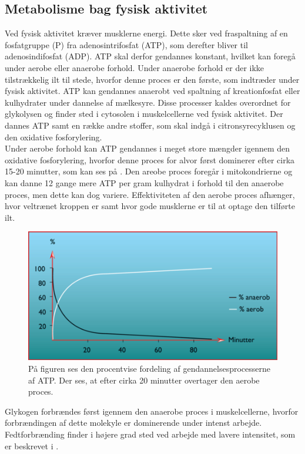 \subsection{Metabolisme bag fysisk aktivitet}
Ved fysisk aktivitet kræver musklerne energi. Dette sker ved fraspaltning af en fosfatgruppe (P) fra adenosintrifosfat (ATP), som derefter bliver til adenosindifosfat (ADP). ATP skal derfor gendannes konstant, hvilket kan foregå under aerobe eller anaerobe forhold. Under anaerobe forhold er der ikke tilstrækkelig ilt til stede, hvorfor denne proces er den første, som indtræder under fysisk aktivitet. ATP kan gendannes anaerobt ved spaltning af kreationfosfat eller kulhydrater under dannelse af mælkesyre. Disse processer kaldes overordnet for glykolysen og finder sted i cytosolen i muskelcellerne ved fysisk aktivitet. Der dannes ATP samt en række andre stoffer, som skal indgå i citronsyrecyklusen og den oxidative fosforylering.\citep{Martini2012,Engelbreth2010} \\
Under aerobe forhold kan ATP gendannes i meget store mængder igennem den oxidative fosforylering, hvorfor denne proces for alvor først dominerer efter cirka 15-20 minutter, som kan ses på . Den areobe proces foregår i mitokondrierne og kan danne 12 gange mere ATP per gram kulhydrat i forhold til den anaerobe proces, men dette kan dog variere. Effektiviteten af den aerobe proces afhænger, hvor veltrænet kroppen er samt hvor gode musklerne er til at optage den tilførte ilt.\citep{Engelbreth2010,Martini2012,Stanfield2013} 
\begin{figure}[H]
	\centering
	\includegraphics[scale=0.65]{figures/aProblemanalyse/Metabolisme.png}
	\caption{På figuren ses den procentvise fordeling af gendannelsesprocesserne af ATP. Der ses, at efter cirka 20 minutter overtager den aerobe proces.\citep{Engelbreth2010}}
	\label{fig:Metabolisme}
\end{figure}
Glykogen forbrændes først igennem den anaerobe proces i muskelcellerne, hvorfor forbrændingen af dette molekyle er dominerende under intenst arbejde. Fedtforbrænding finder i højere grad sted ved arbejde med lavere intensitet, som er beskrevet i .\citep{Martini2012,Stanfield2013,Engelbreth2010}

